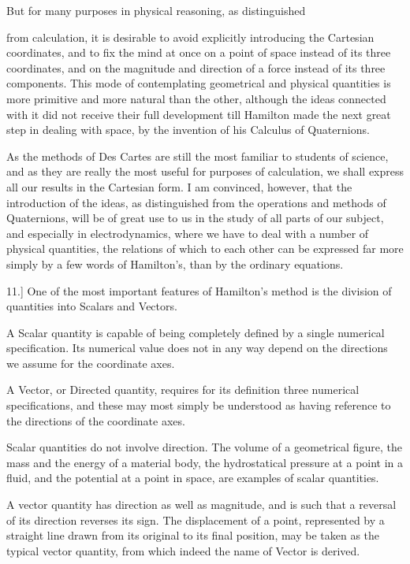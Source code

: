 \documentclass[11pt,a4paper]{article}
\begin{document}
But for many purposes in physical reasoning, as distinguished

\clearpage

from calculation, it is desirable to avoid explicitly introducing the
Cartesian coordinates, and to fix the mind at once on a point of space
instead of its three coordinates, and on the magnitude and direction of
a force instead of its three components. This mode of contemplating
geometrical and physical quantities is more primitive and more natural
than the other, although the ideas connected with it did not receive
their full development till Hamilton made the next great step in
dealing with space, by the invention of his Calculus of Quaternions.

As the methods of Des Cartes are still the most familiar to students of
science, and as they are really the most useful for purposes of
calculation, we shall express all our results in the Cartesian form. I
am convinced, however, that the introduction of the ideas, as
distinguished from the operations and methods of Quaternions, will be of
great use to us in the study of all parts of our subject, and especially
in electrodynamics, where we have to deal with a number of physical
quantities, the relations of which to each other can be expressed far
more simply by a few words of Hamilton's, than by the ordinary
equations.

11.] One of the most important features of Hamilton's method is the
division of quantities into Scalars and Vectors.

A Scalar quantity is capable of being completely defined by a single
numerical specification. Its numerical value does not in any way depend
on the directions we assume for the coordinate axes.

A Vector, or Directed quantity, requires for its definition three
numerical specifications, and these may most simply be understood as
having reference to the directions of the coordinate axes.

Scalar quantities do not involve direction. The volume of a geometrical
figure, the mass and the energy of a material body, the hydrostatical
pressure at a point in a fluid, and the potential at a point in space,
are examples of scalar quantities.

A vector quantity has direction as well as magnitude, and is such that a
reversal of its direction reverses its sign. The displacement of a
point, represented by a straight line drawn from its original to its
final position, may be taken as the typical vector quantity, from which
indeed the name of Vector is derived.
\end{document}
